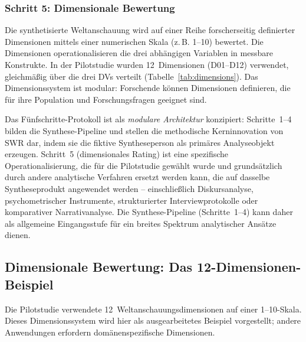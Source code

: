 \documentclass[11pt,a4paper]{article}
\begin{document}
\subsubsection{Schritt 5: Dimensionale Bewertung}

Die synthetisierte Weltanschauung wird auf einer Reihe forscherseitig definierter Dimensionen mittels einer numerischen Skala (z.\,B. 1--10) bewertet. Die Dimensionen operationalisieren die drei abh\"angigen Variablen in messbare Konstrukte. In der Pilotstudie wurden 12~Dimensionen (D01--D12) verwendet, gleichm\"a\ss{}ig \"uber die drei DVs verteilt (Tabelle~\ref{tab:dimensions}). Das Dimensionssystem ist modular: Forschende k\"onnen Dimensionen definieren, die f\"ur ihre Population und Forschungsfragen geeignet sind.

Das F\"unfschritte-Protokoll ist als \emph{modulare Architektur} konzipiert: Schritte~1--4 bilden die Synthese-Pipeline und stellen die methodische Kerninnovation von SWR dar, indem sie die fiktive Syntheseperson als prim\"ares Analyseobjekt erzeugen. Schritt~5 (dimensionales Rating) ist eine spezifische Operationalisierung, die f\"ur die Pilotstudie gew\"ahlt wurde und grunds\"atzlich durch andere analytische Verfahren ersetzt werden kann, die auf dasselbe Syntheseprodukt angewendet werden -- einschlie\ss{}lich Diskursanalyse, psychometrischer Instrumente, strukturierter Interviewprotokolle oder komparativer Narrativanalyse. Die Synthese-Pipeline (Schritte~1--4) kann daher als allgemeine Eingangsstufe f\"ur ein breites Spektrum analytischer Ans\"atze dienen.


\subsection{Dimensionale Bewertung: Das 12-Dimensionen-Beispiel}
\label{sec:method:dimensions}

Die Pilotstudie verwendete 12~Weltanschauungsdimensionen auf einer 1--10-Skala. Dieses Dimensionssystem wird hier als ausgearbeitetes Beispiel vorgestellt; andere Anwendungen erfordern dom\"anenspezifische Dimensionen.
\end{document}
